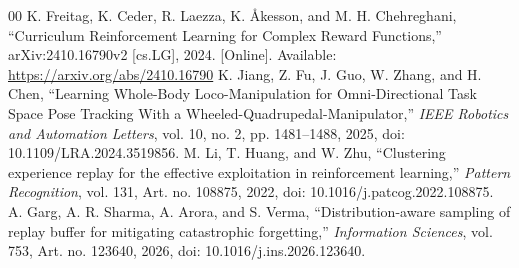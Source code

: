 \documentclass[conference]{IEEEtran}
\begin{document}
\begin{thebibliography}{00}
 K. Freitag, K. Ceder, R. Laezza, K. Åkesson, and M. H. Chehreghani, ``Curriculum Reinforcement Learning for Complex Reward Functions,'' arXiv:2410.16790v2 [cs.LG], 2024. [Online]. Available: \url{https://arxiv.org/abs/2410.16790}
 K. Jiang, Z. Fu, J. Guo, W. Zhang, and H. Chen, ``Learning Whole-Body Loco-Manipulation for Omni-Directional Task Space Pose Tracking With a Wheeled-Quadrupedal-Manipulator,'' \emph{IEEE Robotics and Automation Letters}, vol. 10, no. 2, pp. 1481--1488, 2025, doi: 10.1109/LRA.2024.3519856.
 M. Li, T. Huang, and W. Zhu, ``Clustering experience replay for the effective exploitation in reinforcement learning,'' \emph{Pattern Recognition}, vol. 131, Art. no. 108875, 2022, doi: 10.1016/j.patcog.2022.108875.
 A. Garg, A. R. Sharma, A. Arora, and S. Verma, ``Distribution-aware sampling of replay buffer for mitigating catastrophic forgetting,'' \emph{Information Sciences}, vol. 753, Art. no. 123640, 2026, doi: 10.1016/j.ins.2026.123640.
\end{thebibliography}
\end{document}
